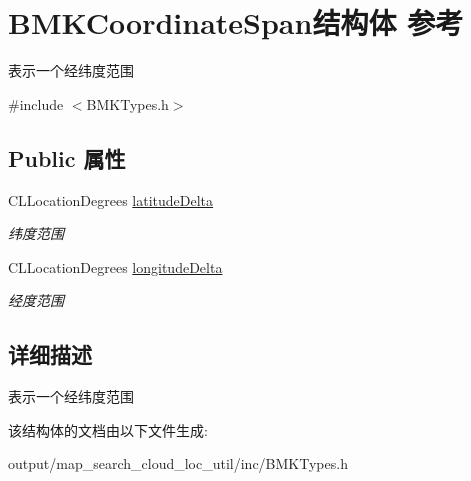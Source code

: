 \hypertarget{struct_b_m_k_coordinate_span}{\section{B\+M\+K\+Coordinate\+Span结构体 参考}
\label{struct_b_m_k_coordinate_span}
}


表示一个经纬度范围  




{\ttfamily \#include $<$B\+M\+K\+Types.\+h$>$}

\subsection*{Public 属性}
\begin{DoxyCompactItemize}
\item 
\hypertarget{struct_b_m_k_coordinate_span_a759543f626366ce4fe599b8896f352a2}{C\+L\+Location\+Degrees \hyperlink{struct_b_m_k_coordinate_span_a759543f626366ce4fe599b8896f352a2}{latitude\+Delta}}\label{struct_b_m_k_coordinate_span_a759543f626366ce4fe599b8896f352a2}

\begin{DoxyCompactList}\small\item\em 纬度范围 \end{DoxyCompactList}\item 
\hypertarget{struct_b_m_k_coordinate_span_ab3bc7d18bbd0fce7c806c51f0e0df447}{C\+L\+Location\+Degrees \hyperlink{struct_b_m_k_coordinate_span_ab3bc7d18bbd0fce7c806c51f0e0df447}{longitude\+Delta}}\label{struct_b_m_k_coordinate_span_ab3bc7d18bbd0fce7c806c51f0e0df447}

\begin{DoxyCompactList}\small\item\em 经度范围 \end{DoxyCompactList}\end{DoxyCompactItemize}


\subsection{详细描述}
表示一个经纬度范围 

该结构体的文档由以下文件生成\+:\begin{DoxyCompactItemize}
\item 
output/map\+\_\+search\+\_\+cloud\+\_\+loc\+\_\+util/inc/B\+M\+K\+Types.\+h\end{DoxyCompactItemize}
